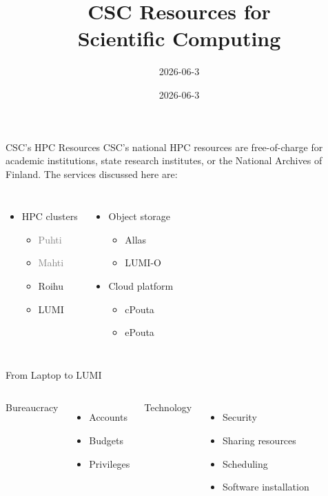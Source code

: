 \documentclass[aspectratio=54,10pt]{beamer}
\title{CSC Resources for\\ Scientific Computing}
\subtitle{2026-06-3}
\date{2026-06-3}
\begin{document}
\begin{frame}{CSC's HPC Resources}
CSC's national HPC resources are free-of-charge for academic institutions, state research institutes, or the National Archives of Finland. The services discussed here are:
\begin{columns}
    \begin{itemize}
        \item HPC clusters
        \begin{itemize}
            \item \textcolor{gray}{Puhti}
            \item \textcolor{gray}{Mahti}
            \item Roihu
            \item LUMI
        \end{itemize}
    \end{itemize}

    \begin{itemize}
        \item Object storage
        \begin{itemize}
            \item Allas
            \item LUMI-O
        \end{itemize}
        \item Cloud platform
        \begin{itemize}
            \item cPouta
            \item ePouta
        \end{itemize}
    \end{itemize}


\end{columns}

\end{frame}

\begin{frame}{From Laptop to LUMI}
\begin{columns}
Bureaucracy
    \begin{itemize}
        \item Accounts
        \item Budgets
        \item Privileges
    \end{itemize}
Technology
    \begin{itemize}
        \item Security
        \item Sharing resources
        \item Scheduling
        \item Software installation
    \end{itemize}
\end{columns}
\end{frame}
\end{document}
